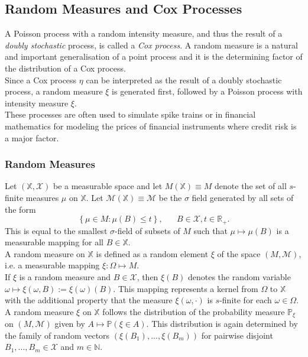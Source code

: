 \subsection{Random Measures and Cox Processes}
A Poisson process with a random intensity measure, and thus the result of a \textit{doubly stochastic} process, is called a \textit{Cox process}. A random measure is a natural and important generalisation of a point process and it is the determining factor of the distribution of a Cox process. \\
Since a Cox process $\eta$ can be interpreted as the result of a doubly stochastic process, a random measure $\xi$ is generated first, followed by a Poisson process with intensity measure $\xi$. \\
These processes are often used to simulate spike trains or in financial mathematics for modeling the prices of financial instruments where credit risk is a major factor.
\subsubsection{Random Measures}
Let $\left(\mathbb{X}, \mathcal{X}\right)$ be a measurable space and let $M\left(\mathbb{X}\right)\equiv M$ denote the set of all $s$-finite measures $\mu$ on $\mathbb{X}$. Let $\mathcal{M}\left(\mathbb{X}\right)\equiv \mathcal{M}$ be the $\sigma$ field generated by all sets of the form
\begin{equation*}
    \left\lbrace\mu\in M:\mu(B)\leq t\right\rbrace, \hspace{20pt}B\in\mathcal{X}, t\in\mathbb{R}_{+}.
\end{equation*}
This is equal to the smallest $\sigma$-field of subsets of $M$ such that $\mu\mapsto\mu(B)$ is a measurable mapping for all $B\in\mathbb{X}$. \\
A random measure on $\mathbb{X}$ is defined as a random element $\xi$ of the space $\left(M,\mathcal{M}\right)$, i.e. a measurable mapping $\xi:\Omega\mapsto M$. \\
If $\xi$ is a random measure and $B\in\mathcal{X}$, then $\xi(B)$ denotes the random variable $\omega\mapsto\xi\left(\omega,B\right):=\xi\left(\omega\right)(B)$. This mapping represents a kernel from $\Omega$ to $\mathbb{X}$ with the additional property that the measure $\xi\left(\omega,\cdot\right)$ is $s$-finite for each $\omega\in\Omega$. \\
A random measure $\xi$ on $\mathbb{X}$ follows the distribution of the probability measure $\mathbb{P}_{\xi}$ on $\left(M,\mathcal{M}\right)$ given by $A\mapsto\mathbb{P}\left(\xi\in A\right)$. This distribution is again determined by the family of random vectors $\left(\xi\left(B_1\right),...,\xi\left(B_m\right)\right)$ for pairwise disjoint $B_1,...,B_m\in\mathcal{X}$ and $m\in\mathbb{N}$.
